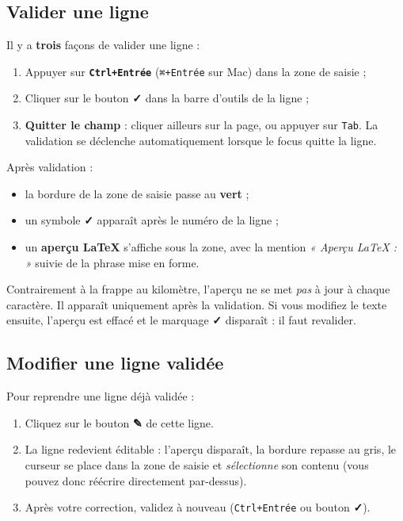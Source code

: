 \documentclass[11pt,a4paper]{article}
\begin{document}
\subsection{Valider une ligne}

Il y a \textbf{trois} façons de valider une ligne :
\begin{enumerate}
  \item Appuyer sur \textbf{\texttt{Ctrl+Entrée}} (\texttt{⌘+Entrée} sur Mac)
        dans la zone de saisie ;
  \item Cliquer sur le bouton \textbf{✓} dans la barre d'outils de la ligne ;
  \item \textbf{Quitter le champ} : cliquer ailleurs sur la page, ou appuyer
        sur \texttt{Tab}. La validation se déclenche automatiquement lorsque le
        focus quitte la ligne.
\end{enumerate}

Après validation :
\begin{itemize}
  \item la bordure de la zone de saisie passe au \textbf{vert} ;
  \item un symbole \textbf{✓} apparaît après le numéro de la ligne ;
  \item un \textbf{aperçu \LaTeX{}} s'affiche sous la zone, avec la mention
        \emph{« Aperçu LaTeX : »} suivie de la phrase mise en forme.
\end{itemize}

\begin{retenir}
Contrairement à la frappe au kilomètre, l'aperçu ne se met \emph{pas} à jour à
chaque caractère. Il apparaît uniquement après la validation. Si vous modifiez
le texte ensuite, l'aperçu est effacé et le marquage \textbf{✓} disparaît :
il faut revalider.
\end{retenir}

\subsection{Modifier une ligne validée}

Pour reprendre une ligne déjà validée :
\begin{enumerate}
  \item Cliquez sur le bouton \textbf{✎} de cette ligne.
  \item La ligne redevient éditable : l'aperçu disparaît, la bordure repasse au
        gris, le curseur se place dans la zone de saisie et \emph{sélectionne}
        son contenu (vous pouvez donc réécrire directement par-dessus).
  \item Après votre correction, validez à nouveau (\texttt{Ctrl+Entrée} ou
        bouton \textbf{✓}).
\end{enumerate}
\end{document}
